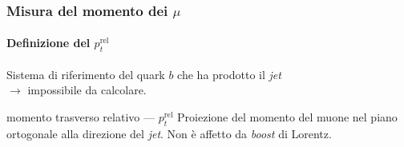 \documentclass[italian]{beamer}
\newcommand{\ptrel}{\ensuremath{p_{t}^{\text{rel}}}}
\begin{document}
\begin{frame}
    \frametitle{Misura del momento dei $\mu$}
    \framesubtitle{Definizione del $\ptrel$}

    Sistema di riferimento del quark $b$ che ha prodotto il \emph{jet}\\
    $\rightarrow$ impossibile da calcolare.
    \vspace{\baselineskip}\\

    \begin{block}
        {momento trasverso relativo --- $\ptrel$}
        Proiezione del momento del muone nel piano ortogonale alla direzione
        del \emph{jet}. Non è affetto da \emph{boost} di Lorentz.
    \end{block}
\end{frame}
\end{document}

